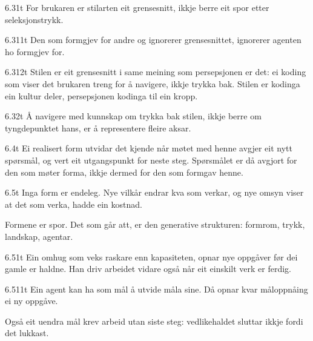 \begin{formproposition}{6.31}{t}
For brukaren er stilarten eit grensesnitt, ikkje berre eit spor etter seleksjonstrykk.
\end{formproposition}

\begin{formproposition}{6.311}{t}
Den som formgjev for andre og ignorerer grensesnittet, ignorerer agenten ho formgjev for.
\end{formproposition}

\begin{formproposition}{6.312}{t}
Stilen er eit grensesnitt i same meining som persepsjonen er det: ei koding som viser det brukaren treng for å navigere, ikkje trykka bak. Stilen er kodinga ein kultur deler, persepsjonen kodinga til ein kropp.
\end{formproposition}

\begin{formproposition}{6.32}{t}
Å navigere med kunnskap om trykka bak stilen, ikkje berre om tyngdepunktet hans, er å representere fleire aksar.
\end{formproposition}

\begin{formproposition}{6.4}{t}
Ei realisert form utvidar det kjende når møtet med henne avgjer eit nytt spørsmål, og vert eit utgangspunkt for neste steg. Spørsmålet er då avgjort for den som møter forma, ikkje dermed for den som formgav henne.
\end{formproposition}

\begin{formproposition}{6.5}{t}
Inga form er endeleg. Nye vilkår endrar kva som verkar, og nye omsyn viser at det som verka, hadde ein kostnad.

Formene er spor. Det som går att, er den generative strukturen: formrom, trykk, landskap, agentar.
\end{formproposition}

\begin{formproposition}{6.51}{t}
Ein omhug som veks raskare enn kapasiteten, opnar nye oppgåver før dei gamle er haldne. Han driv arbeidet vidare også når eit einskilt verk er ferdig.
\end{formproposition}

\begin{formproposition}{6.511}{t}
Ein agent kan ha som mål å utvide måla sine. Då opnar kvar måloppnåing ei ny oppgåve.

Også eit uendra mål krev arbeid utan siste steg: vedlikehaldet sluttar ikkje fordi det lukkast.
\end{formproposition}

